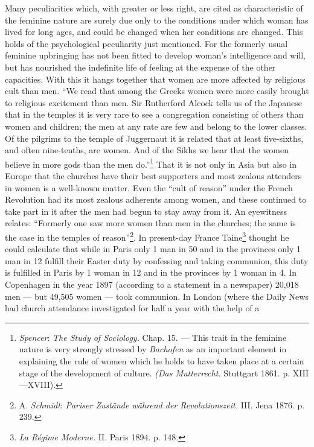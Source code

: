 \documentclass[12pt,a4paper,openany]{book}
\newcommand{\opage}[1]{\marginnote{\footnotesize\textit{[#1]}}}
\begin{document}
Many peculiarities which, with greater or
\opage{320}less right, are cited as characteristic of the feminine nature are surely due only to the conditions under
which woman has lived for long ages, and could be changed when her conditions are changed. This holds of the
psychological peculiarity just mentioned. For the formerly usual feminine upbringing has not been fitted to develop
woman's intelligence and will, but has nourished the indefinite life of feeling at the expense of the other capacities.
With this it hangs together that women are more affected by religious cult than men. ``We read that among the Greeks
women were more easily brought to religious excitement than men. Sir Rutherford Alcock tells us of the Japanese that in
the temples it is very rare to see a congregation consisting of others than women and children; the men at any rate are
few and belong to the lower classes. Of the pilgrims to the temple of Juggernaut it is related that at least five-sixths,
and often nine-tenths, are women. And of the Sikhs we hear that the women believe in more gods than the men
do.''\footnote[1]{\emph{Spencer}: \textit{The Study of Sociology.} Chap. 15. --- This trait in the feminine nature is
very strongly stressed by \emph{Bachofen} as an important element in explaining the rule of women which he holds to have
taken place at a certain stage of the development of culture. \textit{(Das Mutterrecht.} Stuttgart 1861. p.
XIII---XVIII).}%
That it is not only in Asia but also in Europe that the churches have their best supporters and most zealous attenders
in women is a well-known matter. Even the ``cult of reason'' under the French Revolution had its most zealous adherents
among women, and these continued to take part in it after the men had begun to stay away from it. An eyewitness
relates: ``Formerly one saw more women than men in the churches; the same is the case in the temples of
reason''\footnote[2]{A. \emph{Schmidt}: \textit{Pariser Zustände während der Revolutionszeit.} III. Jena 1876. p. 239.}.
In present-day France Taine\footnote[3]{\textit{La Régime Moderne.} II. Paris 1894. p. 148.} thought he could calculate
that while in Paris only 1 man in 50 and in the provinces only 1 man in 12 fulfill their Easter duty by confessing and
taking communion, this duty is fulfilled in Paris by 1 woman in 12 and in the provinces by 1 woman
\opage{321}in 4. In Copenhagen in the year 1897 (according to a statement in a newspaper) 20,018 men --- but 49,505 women
--- took communion. In London (where the Daily News had church attendance investigated for half a year with the help of a
\end{document}

